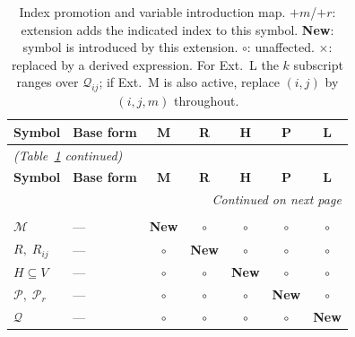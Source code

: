\begin{longtable}{llccccc}
\caption{Index promotion and variable introduction map.
  $+m$/$+r$: extension adds the indicated index to this symbol.
  \textbf{New}: symbol is introduced by this extension.
  $\circ$: unaffected.
  $\times$: replaced by a derived expression.
  For Ext.~L the $k$ subscript ranges over $\mathcal{Q}_{ij}$; if Ext.~M is
  also active, replace $(i,j)$ by $(i,j,m)$ throughout.}
\label{tab:index-map}\\
\toprule
\textbf{Symbol} & \textbf{Base form}
  & \textbf{M} & \textbf{R} & \textbf{H} & \textbf{P} & \textbf{L} \\
\midrule
\endfirsthead
\multicolumn{7}{l}{\small\itshape (Table~\ref{tab:index-map} continued)}\\
\toprule
\textbf{Symbol} & \textbf{Base form}
  & \textbf{M} & \textbf{R} & \textbf{H} & \textbf{P} & \textbf{L} \\
\midrule
\endhead
\midrule
\multicolumn{7}{r}{\small\itshape Continued on next page}\\
\endfoot
\bottomrule
\endlastfoot

\multicolumn{7}{l}{\textit{Sets}} \\
$\mathcal{M}$
  & ---
  & \textbf{New} & $\circ$ & $\circ$ & $\circ$ & $\circ$ \\
$R,\;R_{ij}$
  & ---
  & $\circ$ & \textbf{New} & $\circ$ & $\circ$ & $\circ$ \\
$H\subseteq V$
  & ---
  & $\circ$ & $\circ$ & \textbf{New} & $\circ$ & $\circ$ \\
$\mathcal{P},\;\mathcal{P}_r$
  & ---
  & $\circ$ & $\circ$ & $\circ$ & \textbf{New} & $\circ$ \\
$\mathcal{Q}$
  & ---
  & $\circ$ & $\circ$ & $\circ$ & $\circ$ & \textbf{New} \\[4pt]


\end{longtable}
